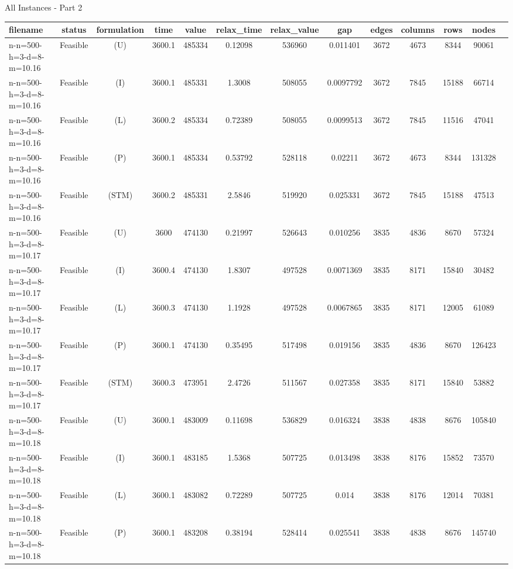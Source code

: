 \documentclass[landscape, a4paper]{article}
\newcommand{\STM}{\ensuremath{\mathrm{STM}}}
\newcommand{\Improved}{\ensuremath{\mathrm{I}}}
\newcommand{\Loose}{\ensuremath{\mathrm{L}}}
\newcommand{\Profit}{\ensuremath{\mathrm{P}}}
\newcommand{\Utility}{\ensuremath{\mathrm{U}}}
\begin{document}
\begin{center}
All Instances - Part 2

\begin{tabular}{lcccccccccccc}
filename & status & formulation & time & value & relax\_time & relax\_value & gap & edges & columns & rows & nodes & \\
\hline
n-n=500-h=3-d=8-m=10.16 & Feasible & (\Utility) & 3600.1 & 485334 & 0.12098 & 536960 & 0.011401 & 3672 & 4673 & 8344 & 90061 & \\
n-n=500-h=3-d=8-m=10.16 & Feasible & (\Improved) & 3600.1 & 485331 & 1.3008 & 508055 & 0.0097792 & 3672 & 7845 & 15188 & 66714 & \\
n-n=500-h=3-d=8-m=10.16 & Feasible & (\Loose) & 3600.2 & 485334 & 0.72389 & 508055 & 0.0099513 & 3672 & 7845 & 11516 & 47041 & \\
n-n=500-h=3-d=8-m=10.16 & Feasible & (\Profit) & 3600.1 & 485334 & 0.53792 & 528118 & 0.02211 & 3672 & 4673 & 8344 & 131328 & \\
n-n=500-h=3-d=8-m=10.16 & Feasible & (\STM) & 3600.2 & 485331 & 2.5846 & 519920 & 0.025331 & 3672 & 7845 & 15188 & 47513 & \\
n-n=500-h=3-d=8-m=10.17 & Feasible & (\Utility) & 3600 & 474130 & 0.21997 & 526643 & 0.010256 & 3835 & 4836 & 8670 & 57324 & \\
n-n=500-h=3-d=8-m=10.17 & Feasible & (\Improved) & 3600.4 & 474130 & 1.8307 & 497528 & 0.0071369 & 3835 & 8171 & 15840 & 30482 & \\
n-n=500-h=3-d=8-m=10.17 & Feasible & (\Loose) & 3600.3 & 474130 & 1.1928 & 497528 & 0.0067865 & 3835 & 8171 & 12005 & 61089 & \\
n-n=500-h=3-d=8-m=10.17 & Feasible & (\Profit) & 3600.1 & 474130 & 0.35495 & 517498 & 0.019156 & 3835 & 4836 & 8670 & 126423 & \\
n-n=500-h=3-d=8-m=10.17 & Feasible & (\STM) & 3600.3 & 473951 & 2.4726 & 511567 & 0.027358 & 3835 & 8171 & 15840 & 53882 & \\
n-n=500-h=3-d=8-m=10.18 & Feasible & (\Utility) & 3600.1 & 483009 & 0.11698 & 536829 & 0.016324 & 3838 & 4838 & 8676 & 105840 & \\
n-n=500-h=3-d=8-m=10.18 & Feasible & (\Improved) & 3600.1 & 483185 & 1.5368 & 507725 & 0.013498 & 3838 & 8176 & 15852 & 73570 & \\
n-n=500-h=3-d=8-m=10.18 & Feasible & (\Loose) & 3600.1 & 483082 & 0.72289 & 507725 & 0.014 & 3838 & 8176 & 12014 & 70381 & \\
n-n=500-h=3-d=8-m=10.18 & Feasible & (\Profit) & 3600.1 & 483208 & 0.38194 & 528414 & 0.025541 & 3838 & 4838 & 8676 & 145740 & \\

\end{tabular}
\end{center}
\end{document}

